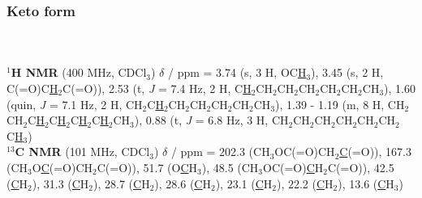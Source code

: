 \subsubsection*{Keto form }%
\\[1\baselineskip]
\\[1\baselineskip]
\textbf{$^{1}$H NMR} (400 MHz, CDCl$_3$) $\delta$ / ppm = 
	3.74 (s, 3 H, OC\underline{H}$_3$), 
	3.45 (s, 2 H, C(=O)C\underline{H}$_2$C(=O)), 
	2.53 (t, \textit{J} = 7.4 Hz, 2 H, C\underline{H}$_2$CH$_2$CH$_2$CH$_2$CH$_2$CH$_2$CH$_3$), 
	1.60 (quin, \textit{J} = 7.1 Hz, 2 H, CH$_2$C\underline{H}$_2$CH$_2$CH$_2$CH$_2$CH$_2$CH$_3$),
	1.39 - 1.19 (m, 8 H, CH$_2$CH$_2$C\underline{H}$_2$C\underline{H}$_2$C\underline{H}$_2$C\underline{H}$_2$CH$_3$), 
	0.88 (t, \textit{J} = 6.8 Hz, 3 H,    CH$_2$CH$_2$CH$_2$CH$_2$CH$_2$CH$_2$C\underline{H}$_3$)
\\[1\baselineskip]
\textbf{$^{13}$C NMR} (101 MHz, CDCl$_3$) $\delta$ / ppm = 
	202.3 (CH$_3$OC(=O)CH$_2$\underline{C}(=O)), 
	167.3 (CH$_3$O\underline{C}(=O)CH$_2$C(=O)),
	51.7 (O\underline{C}H$_3$), 
	48.5 (CH$_3$OC(=O)\underline{C}H$_2$C(=O)), 
	42.5 (\underline{C}H$_2$), 
	31.3 (\underline{C}H$_2$), 
	28.7 (\underline{C}H$_2$), 
	28.6 (\underline{C}H$_2$), 
	23.1 (\underline{C}H$_2$), 
	22.2 (\underline{C}H$_2$), 
	13.6 (\underline{C}H$_3$)
\\[1\baselineskip]
